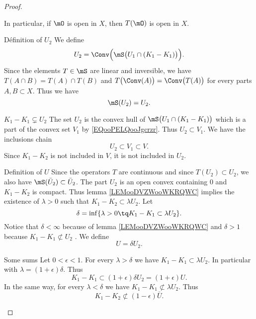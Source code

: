 \begin{proof}
\begin{subproof}
        In particular, if \( \mO\) is open in \( X\), then \( T(\mO)\) is open in \( X\).
    \item[Définition of \( U_2\)]
        We define
        \begin{equation}       
            U_2=\Conv\Big( \mS\big(  U_1\cap(K_1-K_1)  \big) \Big).
        \end{equation}
        Since the elements \( T\in \mS\) are linear and inversible, we have \( T(A\cap B)=T(A)\cap T(B)\) and \( T\big( \Conv(A) \big)=\Conv\big( T(A) \big)\) for every parts \( A,B\subset X\). Thus we have
        \begin{equation}
            \mS(U_2)=U_2.
        \end{equation}
    \item[\( K_1-K_1\subsetneq U_2\)]
        The set \( U_2\) is the convex hull of \( \mS\big( U_1\cap (K_1-K_1) \big)\) which is a part of the convex set \( V_1\) by \eqref{EQooPELQooJgcrzr}. Thus \( U_2\subset V_1\). We have the inclusions chain
        \begin{equation}
            U_2\subset V_1\subset V.
        \end{equation}
        Since \( K_1-K_2\) is not included in \( V\), it is not included in \( U_2\).
    \item[Definition of \( U\)]
        Since the operators \( T\) are continuous and since \( T(U_2)\subset U_2\), we also have \( \mS(\bar U_2)\subset \bar U_2\). The part \( U_2 \) is an open convex containing \( 0\) and \( K_1-K_2\) is compact. Thus lemma \ref{LEMooDVZWooWKRQWC} implies the existence of \( \lambda>0\) such that \( K_1-K_2 \subset \lambda U_2\). Let
        \begin{equation}
            \delta=\inf\{ \lambda>0\tq K_1-K_1\subset \lambda U_2 \}.
        \end{equation}
        Notice that \( \delta<\infty\) because of lemma \ref{LEMooDVZWooWKRQWC} and \( \delta >1\) because \( K_1-K_1\nsubset U_2\) . We define
        \begin{equation}
            U=\delta U_2.
        \end{equation}
    \item[Some sums]
        Let \(   0<\epsilon<1   \). For every \( \lambda>\delta\) we have \( K_1-K_1\subset \lambda U_2\). In particular with \( \lambda= (1+\epsilon)\delta\). Thus
        \begin{equation}
            K_1-K_1\subset (1+\epsilon)\delta U_2=(1+\epsilon)U.
        \end{equation}
        In the same way, for every \( \lambda<\delta\) we have \( K_1-K_1\nsubset \lambda U_2\). Thus
        \begin{equation}        \label{EQooNYNTooQScVJL}
            K_1-K_2\nsubset (1-\epsilon)\bar U.
        \end{equation}
        

\end{subproof}
\end{proof}
